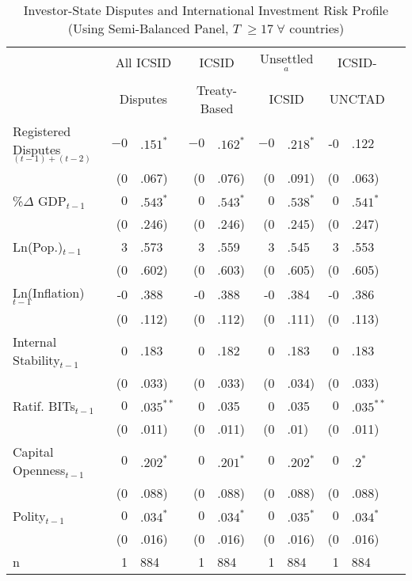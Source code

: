 \documentclass[12pt,onesided]{amsart}
\begin{document}
\begin{table}[ht]
\centering
\caption{Investor-State Disputes and International Investment Risk Profile (Using Semi-Balanced Panel, $T \; \geq 17 \;  \forall$ countries)}
\label{tab:dispRepLevelBal}
\begin{tabular}{lr@{} lr@{}lr@{}lr@{}lr@{}}
  \hline\hline
  & \multicolumn{2}{c}{All ICSID} & \multicolumn{2}{c}{ICSID} & \multicolumn{2}{c}{Unsettled$^{a}$} & \multicolumn{2}{c}{ICSID-} \\ 
  & \multicolumn{2}{c}{Disputes} & \multicolumn{2}{c}{Treaty-Based} & \multicolumn{2}{c}{ICSID} & \multicolumn{2}{c}{UNCTAD} \\
 \hline
Registered Disputes$_{(t-1) + (t-2)}$ & $-0$&$.151^{\ast}$ & $-0$&$.162^{\ast}$ & $-0$&$.218^{\ast}$ & -0&.122 \\ 
   & (0&.067) & (0&.076) & (0&.091) & (0&.063) \\ 
  \%$\Delta$ GDP$_{t-1}$ & $0$&$.543^{\ast}$ & $0$&$.543^{\ast}$ & $0$&$.538^{\ast}$ & $0$&$.541^{\ast}$ \\ 
   & (0&.246) & (0&.246) & (0&.245) & (0&.247) \\ 
  Ln(Pop.)$_{t-1}$ & 3&.573 & 3&.559 & 3&.545 & 3&.553 \\ 
   & (0&.602) & (0&.603) & (0&.605) & (0&.605) \\ 
  Ln(Inflation)$_{t-1}$ & -0&.388 & -0&.388 & -0&.384 & -0&.386 \\ 
   & (0&.112) & (0&.112) & (0&.111) & (0&.113) \\ 
  Internal Stability$_{t-1}$ & 0&.183 & 0&.182 & 0&.183 & 0&.183 \\ 
   & (0&.033) & (0&.033) & (0&.034) & (0&.033) \\ 
  Ratif. BITs$_{t-1}$ & $0$&$.035^{\ast\ast}$ & 0&.035 & 0&.035 & $0$&$.035^{\ast\ast}$ \\ 
   & (0&.011) & (0&.011) & (0&.01) & (0&.011) \\ 
  Capital Openness$_{t-1}$ & $0$&$.202^{\ast}$ & $0$&$.201^{\ast}$ & $0$&$.202^{\ast}$ & $0$&$.2^{\ast}$ \\ 
   & (0&.088) & (0&.088) & (0&.088) & (0&.088) \\ 
  Polity$_{t-1}$ & $0$&$.034^{\ast}$ & $0$&$.034^{\ast}$ & $0$&$.035^{\ast}$ & $0$&$.034^{\ast}$ \\ 
   & (0&.016) & (0&.016) & (0&.016) & (0&.016) \\ 
   \hline
n & 1&884 & 1&884 & 1&884 & 1&884 \\ 

\end{tabular}
\end{table}
\end{document}

